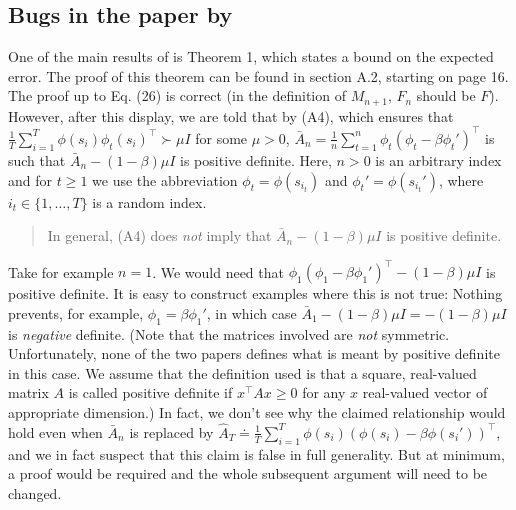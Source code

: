 \documentclass{article}
\begin{document}
\subsection{Bugs in the paper by \cite{flstda}}
One of the main results of \citet{flstda} is Theorem 1, which states a bound on the expected error.
The proof of this theorem can be found in section A.2, starting on page 16.
The proof up to Eq. (26) is correct (in the definition of $M_{n+1}$, $F_n$ should be $F$).
However, after this display, we are told that by (A4), which ensures that $\frac1T \sum_{i=1}^T \phi(s_i) \phi_t(s_i)^\top \succ \mu I$ for some $\mu>0$, $\bar A_n = \frac1n \sum_{t=1}^n \phi_t (\phi_t - \beta \phi_t')^\top$ is such that $\bar A_n - (1-\beta) \mu I $ is positive definite. 
Here, $n>0$ is an arbitrary index and for $t\ge 1$ we use the abbreviation $\phi_t = \phi(s_{i_t})$ and $\phi_t' = \phi(s_{i_t}')$, where $i_t\in \{1,\dots,T\}$ is a random index.
\begin{quote}
In general, (A4) does \emph{not} imply that  $\bar A_n - (1-\beta) \mu I $ is positive definite.
\end{quote}
Take for example $n=1$. We would need that $\phi_1 (\phi_1 - \beta \phi_1')^\top - (1-\beta) \mu I$ is positive definite.
It is easy to construct examples where this is not true: Nothing prevents, for example, $\phi_1 = \beta \phi_1'$, in which case $\bar A_1 - (1-\beta)\mu I = -(1-\beta)\mu I$ is \emph{negative} definite.
(Note that the matrices involved are \emph{not} symmetric. Unfortunately, none of the two papers defines what is meant by positive definite in this case. We assume that the definition used is that a square, real-valued matrix $A$ is called positive definite if $x^\top A x\ge 0$ for any $x$ real-valued vector of appropriate dimension.)
In fact, we don't see why the claimed relationship would hold even when 
$\bar A_n$ is replaced by $\hat A_T \doteq  \frac1T \sum_{i=1}^T \phi( s_i) (\phi(s_i) - \beta \phi(s_i'))^\top$,
and we in fact suspect that this claim is false in full generality. But at minimum, a proof would be required and the whole subsequent argument will need to be changed.
\end{document}
